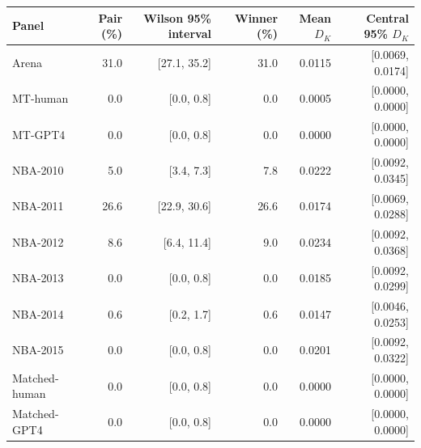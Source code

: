 \begin{tabular}{lrrrrr}
\toprule
Panel & Pair (\%) & Wilson 95\% interval & Winner (\%) & Mean $D_K$ & Central 95\% $D_K$ \\
\midrule
Arena & 31.0 & [27.1, 35.2] & 31.0 & 0.0115 & [0.0069, 0.0174] \\
MT-human & 0.0 & [0.0, 0.8] & 0.0 & 0.0005 & [0.0000, 0.0000] \\
MT-GPT4 & 0.0 & [0.0, 0.8] & 0.0 & 0.0000 & [0.0000, 0.0000] \\
NBA-2010 & 5.0 & [3.4, 7.3] & 7.8 & 0.0222 & [0.0092, 0.0345] \\
NBA-2011 & 26.6 & [22.9, 30.6] & 26.6 & 0.0174 & [0.0069, 0.0288] \\
NBA-2012 & 8.6 & [6.4, 11.4] & 9.0 & 0.0234 & [0.0092, 0.0368] \\
NBA-2013 & 0.0 & [0.0, 0.8] & 0.0 & 0.0185 & [0.0092, 0.0299] \\
NBA-2014 & 0.6 & [0.2, 1.7] & 0.6 & 0.0147 & [0.0046, 0.0253] \\
NBA-2015 & 0.0 & [0.0, 0.8] & 0.0 & 0.0201 & [0.0092, 0.0322] \\
Matched-human & 0.0 & [0.0, 0.8] & 0.0 & 0.0000 & [0.0000, 0.0000] \\
Matched-GPT4 & 0.0 & [0.0, 0.8] & 0.0 & 0.0000 & [0.0000, 0.0000] \\
\bottomrule
\end{tabular}
